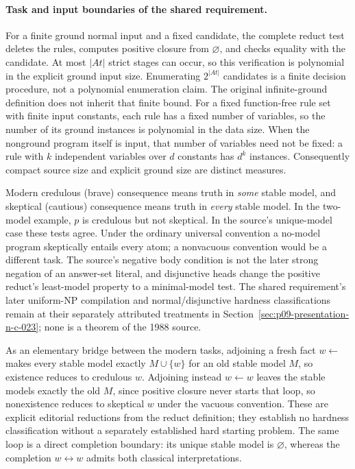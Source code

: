 \paragraph{Task and input boundaries of the shared requirement.}
For a finite ground normal input and a fixed candidate, the complete reduct
test deletes the rules, computes positive closure from \(\varnothing\), and
checks equality with the candidate.  At most \(\lvert At\rvert\) strict
stages can occur, so this verification is polynomial in the explicit ground
input size.  Enumerating \(2^{\lvert At\rvert}\) candidates is a finite
decision procedure, not a polynomial enumeration claim.  The original
infinite-ground definition does not inherit that finite bound.
For a fixed function-free rule set with finite input constants, each rule has
a fixed number of variables, so the number of its ground instances is
polynomial in the data size.  When the nonground program itself is input,
that number of variables need not be fixed: a rule with \(k\) independent
variables over \(d\) constants has \(d^k\) instances.  Consequently compact
source size and explicit ground size are distinct measures.

Modern credulous (brave) consequence means truth in \emph{some} stable model,
and skeptical (cautious) consequence means truth in \emph{every} stable model.
In the two-model example, \(p\) is credulous but not skeptical.  In the
source's unique-model case these tests agree.  Under the ordinary universal
convention a no-model program skeptically entails every atom; a nonvacuous
convention would be a different task.  The source's negative body condition
is not the later strong negation of an answer-set literal, and disjunctive
heads change the positive reduct's least-model property to a minimal-model
test.  The shared requirement's later uniform-NP compilation and
normal/disjunctive hardness classifications remain at their separately
attributed treatments in Section~\ref{sec:p09-presentation-n-c-023}; none
is a theorem of the 1988 source.

As an elementary bridge between the modern tasks, adjoining a fresh fact
\(w\leftarrow\) makes every stable model exactly \(M\cup\{w\}\) for an
old stable model \(M\), so existence reduces to credulous \(w\).
Adjoining instead \(w\leftarrow w\) leaves the stable models exactly the
old \(M\), since positive closure never starts that loop, so nonexistence
reduces to skeptical \(w\) under the vacuous convention.  These are explicit
editorial reductions from the reduct definition; they establish no hardness
classification without a separately established hard starting problem.
The same loop is a direct completion boundary: its unique stable model is
\(\varnothing\), whereas the completion \(w\leftrightarrow w\) admits both
classical interpretations.
